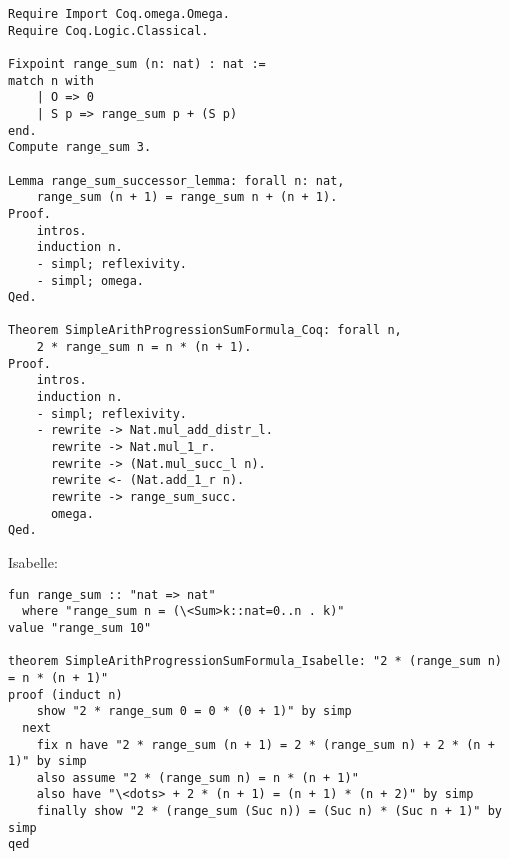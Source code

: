 \documentclass[article]{aaltoseries}
\begin{document}
\begin{lstlisting}[language=coq]
Require Import Coq.omega.Omega.
Require Coq.Logic.Classical.

Fixpoint range_sum (n: nat) : nat :=
match n with
    | O => 0
    | S p => range_sum p + (S p)
end.
Compute range_sum 3.

Lemma range_sum_successor_lemma: forall n: nat,
    range_sum (n + 1) = range_sum n + (n + 1).
Proof.
    intros.
    induction n.
    - simpl; reflexivity.
    - simpl; omega.
Qed.

Theorem SimpleArithProgressionSumFormula_Coq: forall n,
    2 * range_sum n = n * (n + 1).
Proof.
    intros.
    induction n.
    - simpl; reflexivity.
    - rewrite -> Nat.mul_add_distr_l.
      rewrite -> Nat.mul_1_r.
      rewrite -> (Nat.mul_succ_l n).
      rewrite <- (Nat.add_1_r n).
      rewrite -> range_sum_succ.
      omega.
Qed.
\end{lstlisting}


Isabelle:

\begin{lstlisting}[language=isabelle]
fun range_sum :: "nat => nat"
  where "range_sum n = (\<Sum>k::nat=0..n . k)"
value "range_sum 10"

theorem SimpleArithProgressionSumFormula_Isabelle: "2 * (range_sum n) = n * (n + 1)"
proof (induct n)
    show "2 * range_sum 0 = 0 * (0 + 1)" by simp
  next
    fix n have "2 * range_sum (n + 1) = 2 * (range_sum n) + 2 * (n + 1)" by simp
    also assume "2 * (range_sum n) = n * (n + 1)"
    also have "\<dots> + 2 * (n + 1) = (n + 1) * (n + 2)" by simp
    finally show "2 * (range_sum (Suc n)) = (Suc n) * (Suc n + 1)" by simp
qed
\end{lstlisting}



%
\end{document}
